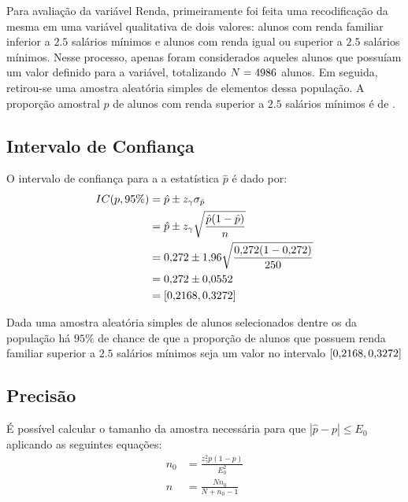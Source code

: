 

Para avaliação da variável Renda, primeiramente foi feita uma recodificação
da mesma em uma variável qualitativa de dois valores: alunos com renda
familiar inferior a $\num{2,5}$ salários mínimos e alunos com renda igual ou
superior a $\num{2,5}$ salários mínimos. Nesse processo, apenas foram considerados
aqueles alunos que possuíam um valor definido para a variável, totalizando
$N=4986$ alunos. Em seguida, retirou-se uma amostra aleatória simples de
\SEISn elementos dessa população. A proporção amostral $\hat{p}$ de alunos
com renda superior a $\num{2.5}$ salários mínimos é de \SEISpAmostral.

\subsection{Intervalo de Confiança}

	O intervalo de confiança para a a estatística $\hat{p}$ é dado por:
	\begin{align*}
		IC(p, 95\%) &= \hat{p} \pm z_\gamma \sigma_{\hat{p}} \\
					&= \hat{p} \pm z_\gamma \sqrt{\frac{\hat{p}(1-\hat{p})}{n}} \\
					&= \num{0.272} \pm \num{1.96} \sqrt{\frac{\num{0.272} (1- \num{0.272})}{250}} \nonumber \\
					&= \num{0.272} \pm \num{0.0552} \nonumber \\
					&= [\num{0.2168}, \num{0.3272}]
	\end{align*}

	\noindent Dada uma amostra aleatória simples de \SEISn alunos
	selecionados dentre os \SEISN da população há $95\%$ de chance de que a
	proporção de alunos que possuem renda familiar superior a $\num{2,5}$ salários
	mínimos seja um valor no intervalo $[\num{0.2168}, \num{0.3272}]$

\subsection{Precisão}

	É possível calcular o tamanho da amostra necessária para que $|\hat{p}
	- p| \leq E_0$ aplicando as seguintes equações:
	\begin{align}
		n_0 &= \label{eq:seis-b-n0}
			   \frac{z_\gamma^2 p(1-p)}{E_0^2} \\
		n &= \label{eq:seis-b-n}
			 \frac{N n_0}{N + n_0 - 1} 
	\end{align}

